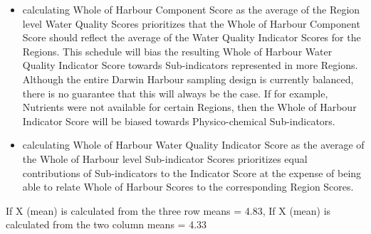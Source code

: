 \documentclass[
  8pt,
  a4paper]{article}
\providecommand{\tightlist}{%
  \setlength{\itemsep}{0pt}\setlength{\parskip}{0pt}}
\begin{document}
\begin{itemize}
\tightlist
\item
  calculating Whole of Harbour Component Score as the average of the
  Region level Water Quality Scores prioritizes that the Whole of
  Harbour Component Score should reflect the average of the Water
  Quality Indicator Scores for the Regions. This schedule will bias the
  resulting Whole of Harbour Water Quality Indicator Score towards
  Sub-indicators represented in more Regions. Although the entire Darwin
  Harbour sampling design is currently balanced, there is no guarantee
  that this will always be the case. If for example, Nutrients were not
  available for certain Regions, then the Whole of Harbour Indicator
  Score will be biased towards Physico-chemical Sub-indicators.
\item
  calculating Whole of Harbour Water Quality Indicator Score as the
  average of the Whole of Harbour level Sub-indicator Scores prioritizes
  equal contributions of Sub-indicators to the Indicator Score at the
  expense of being able to relate Whole of Harbour Scores to the
  corresponding Region Scores.
\end{itemize}

\begin{table}

\caption{\label{tbl-complexity}Fabricated illustration of the
discrepancies between total means (i.e.~Whole of Harbour Indicator
Score) generated from row means (Region Sub-indicator Scores) and column
means (Whole of Harbour Sub-indicator Scores).}


\end{table}%

If X (mean) is calculated from the three row means = 4.83, If X (mean)
is calculated from the two column means = 4.33
\end{document}
